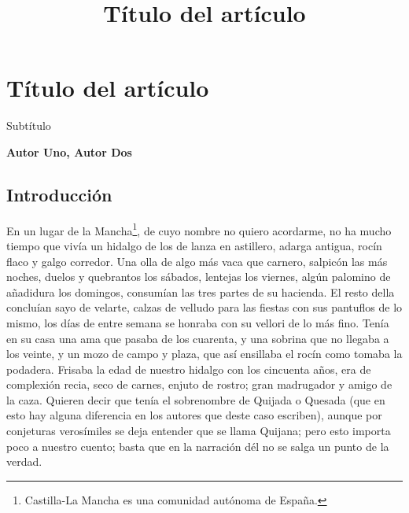 %
\newpage
\section[Título del artículo\\{\footnotesize \textit{Autor Uno, Autor Dos}}]{Título del artículo}
\title{Título del artículo}
{\noindent\large Subtítulo} %

\begin{flushleft}
{\footnotesize \textbf{Autor Uno, Autor Dos}}
\end{flushleft}

\subsection{Introducción}
En un lugar de la Mancha\footnote{Castilla-La Mancha es una comunidad autónoma de España.}, de cuyo nombre no quiero acordarme, no ha mucho tiempo que vivía un hidalgo de los de lanza en astillero, adarga antigua, rocín flaco y galgo corredor. Una olla de algo más vaca que carnero, salpicón las más noches, duelos y quebrantos los sábados, lentejas los viernes, algún palomino de añadidura los domingos, consumían las tres partes de su hacienda. El resto della concluían sayo de velarte, calzas de velludo para las fiestas con sus pantuflos de lo mismo, los días de entre semana se honraba con su vellori de lo más fino. Tenía en su casa una ama que pasaba de los cuarenta, y una sobrina que no llegaba a los veinte, y un mozo de campo y plaza, que así ensillaba el rocín como tomaba la podadera. Frisaba la edad de nuestro hidalgo con los cincuenta años, era de complexión recia, seco de carnes, enjuto de rostro; gran madrugador y amigo de la caza. Quieren decir que tenía el sobrenombre de Quijada o Quesada (que en esto hay alguna diferencia en los autores que deste caso escriben), aunque por conjeturas verosímiles se deja entender que se llama Quijana; pero esto importa poco a nuestro cuento; basta que en la narración dél no se salga un punto de la verdad. 



